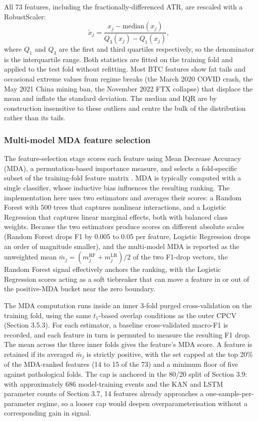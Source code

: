 All 73 features, including the fractionally-differenced ATR, are rescaled with a RobustScaler:
\begin{equation}
\tilde{x}_j = \frac{x_j - \text{median}(x_j)}{Q_3(x_j) - Q_1(x_j)},
\label{eq:robust_scaler}
\end{equation}
where $Q_1$ and $Q_3$ are the first and third quartiles respectively, so the denominator is the interquartile range. Both statistics are fitted on the training fold and applied to the test fold without refitting. Most BTC features show fat tails and occasional extreme values from regime breaks (the March 2020 COVID crash, the May 2021 China mining ban, the November 2022 FTX collapse) that displace the mean and inflate the standard deviation. The median and IQR are by construction insensitive to these outliers and centre the bulk of the distribution rather than its tails.


\subsubsection{Multi-model MDA feature selection}\label{subsubsec:mda}

The feature-selection stage scores each feature using Mean Decrease Accuracy (MDA), a permutation-based importance measure, and selects a fold-specific subset of the training-fold feature matrix \citep[Section 8.4]{lopez_de_prado_2018}. MDA is typically computed with a single classifier, whose inductive bias influences the resulting ranking. The implementation here uses two estimators and averages their scores: a Random Forest with 500 trees that captures nonlinear interactions, and a Logistic Regression that captures linear marginal effects, both with balanced class weights. Because the two estimators produce scores on different absolute scales (Random Forest drops F1 by 0.005 to 0.05 per feature, Logistic Regression drops an order of magnitude smaller), and the multi-model MDA is reported as the unweighted mean $\bar{m}_j = (m^{\text{RF}}_j + m^{\text{LR}}_j) / 2$ of the two F1-drop vectors, the Random Forest signal effectively anchors the ranking, with the Logistic Regression scores acting as a soft tiebreaker that can move a feature in or out of the positive-MDA bucket near the zero boundary.

The MDA computation runs inside an inner 3-fold purged cross-validation on the training fold, using the same $t_1$-based overlap conditions as the outer CPCV (Section 3.5.3). For each estimator, a baseline cross-validated macro-F1 is recorded, and each feature in turn is permuted to measure the resulting F1 drop. The mean across the three inner folds gives the feature's MDA score. A feature is retained if its averaged $\bar{m}_j$ is strictly positive, with the set capped at the top 20\% of the MDA-ranked features (14 to 15 of the 73) and a minimum floor of five against pathological folds. The cap is anchored in the 80/20 split of Section 3.9: with approximately 686 model-training events and the KAN and LSTM parameter counts of Section 3.7, 14 features already approaches a one-sample-per-parameter regime, so a looser cap would deepen overparameterisation without a corresponding gain in signal.

